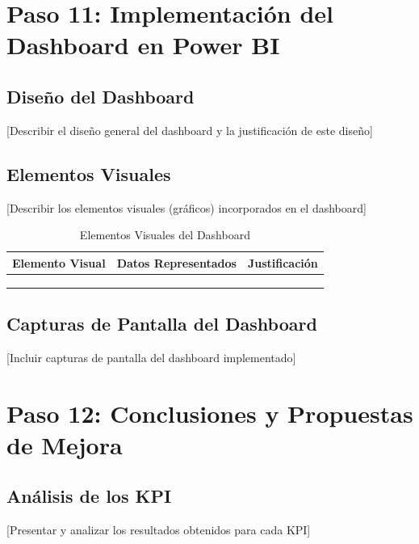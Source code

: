 \documentclass[12pt,letterpaper]{report}
\begin{document}
\section{Paso 11: Implementación del Dashboard en Power BI}

\subsection{Diseño del Dashboard}
[Describir el diseño general del dashboard y la justificación de este diseño]

\subsection{Elementos Visuales}
[Describir los elementos visuales (gráficos) incorporados en el dashboard]

\begin{table}[H]
    \centering
    \begin{tabularx}{\textwidth}{|X|X|X|}
        \hline
        \textbf{Elemento Visual} & \textbf{Datos Representados} & \textbf{Justificación} \\
        \hline
        & & \\
        \hline
        & & \\
        \hline
        & & \\
        \hline
    \end{tabularx}
    \caption{Elementos Visuales del Dashboard}
\end{table}

\subsection{Capturas de Pantalla del Dashboard}
[Incluir capturas de pantalla del dashboard implementado]

\section{Paso 12: Conclusiones y Propuestas de Mejora}

\subsection{Análisis de los KPI}
[Presentar y analizar los resultados obtenidos para cada KPI]
\end{document}
